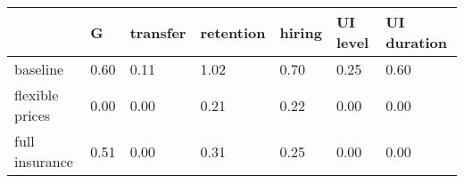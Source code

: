 \begin{tabular}{lllllll}
\toprule
 & \textbf{G} & \textbf{transfer} & \textbf{retention} & \textbf{hiring} & \textbf{UI level} & \textbf{UI duration} \\
\midrule
baseline & 0.60 & 0.11 & 1.02 & 0.70 & 0.25 & 0.60 \\
flexible prices & 0.00 & 0.00 & 0.21 & 0.22 & 0.00 & 0.00 \\
full insurance & 0.51 & 0.00 & 0.31 & 0.25 & 0.00 & 0.00 \\
\bottomrule
\end{tabular}

